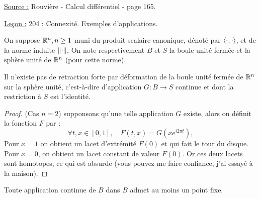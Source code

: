 

\pagestyle{fancy}

\fancyhead[R]{}



\underline{Source :} Rouvière - Calcul différentiel - page 165. \newline

\underline{Leçon :} 204 : Connexité. Exemples d’applications. \newline

\begin{nota}
On suppose $\mathbb{R}^n, n \geq 1$ muni du produit scalaire canonique, dénoté par $\langle\cdot, \cdot\rangle$, 
et de la norme induite $\lVert\cdot\rVert$.
On note respectivement $B$ et $S$ la boule unité fermée et la sphère unité de $\mathbb{R}^n$ (pour cette norme).
\end{nota}

\begin{lem}
\label{lem:lacets}
Il n'existe pas de retraction forte par déformation de la boule unité fermée de $\mathbb{R}^n$ sur la sphère unité, 
c'est-à-dire d'application $G :  B \to S$ continue et dont la restriction à $S$ est l'identité. 
\end{lem}

\begin{proof}
(Cas $n=2$) supponsons qu'une telle application $G$ existe, alors on définit la fonction $F$ par :
\[ \forall t,x \in [0,1], \quad F(t,x) = G \left ( xe^{i2\pi t} \right) , \]
Pour $x=1$ on obtient un lacet d'extrémité $F(0)$ et qui fait le tour du disque. 
Pour $x=0$, on obtient un lacet constant de valeur $F(0)$.
Or ces deux lacets sont homotopes, ce qui est absurde (vous pouvez me faire confiance, j'ai essayé à la maison).
\end{proof}

\begin{thm}
Toute application continue de $B$ dans $B$ admet au moins un point fixe.
\end{thm}

